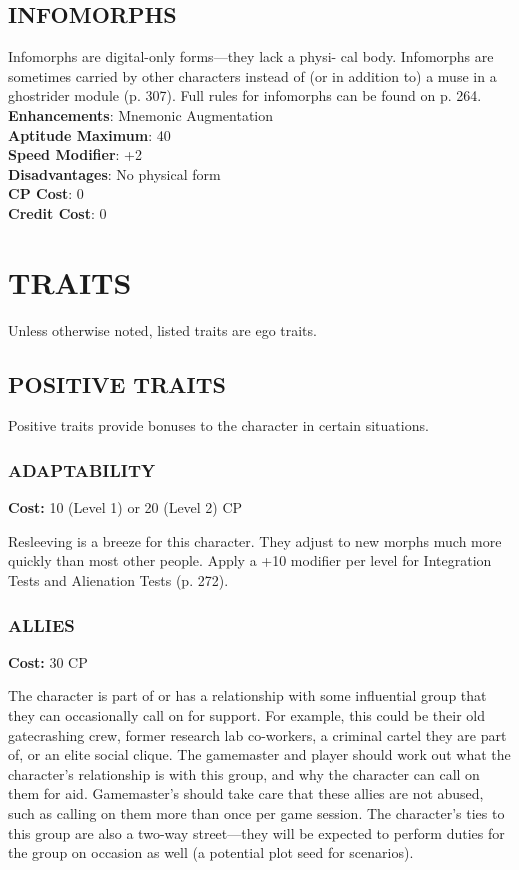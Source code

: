 \subsection{INFOMORPHS}
Infomorphs are digital-only forms—they lack a physi-
cal body. Infomorphs are sometimes carried by other
characters instead of (or in addition to) a muse in a
ghostrider module (p. 307). Full rules for infomorphs
can be found on p. 264.
\\ \textbf{Enhancements}: Mnemonic Augmentation
\\ \textbf{Aptitude Maximum}: 40
\\ \textbf{Speed Modifier}: +2
\\ \textbf{Disadvantages}: No physical form
\\ \textbf{CP Cost}: 0
\\ \textbf{Credit Cost}: 0


\section{TRAITS}
Unless otherwise noted, listed traits are ego traits.

\subsection{POSITIVE TRAITS}
Positive traits provide bonuses to the character in
certain situations.

\subsubsection{ADAPTABILITY}
\textbf{Cost:} 10 (Level 1) or 20 (Level 2) CP

Resleeving is a breeze for this character. They adjust
to new morphs much more quickly than most other
people. Apply a +10 modifier per level for Integration
Tests and Alienation Tests (p. 272).

\subsubsection{ALLIES}
\textbf{Cost:} 30 CP

The character is part of or has a relationship with
some influential group that they can occasionally call
on for support. For example, this could be their old
gatecrashing crew, former research lab co-workers,
a criminal cartel they are part of, or an elite social
clique. The gamemaster and player should work out
what the character’s relationship is with this group,
and why the character can call on them for aid.
Gamemaster’s should take care that these allies are
not abused, such as calling on them more than once
per game session. The character’s ties to this group
are also a two-way street—they will be expected to
perform duties for the group on occasion as well (a
potential plot seed for scenarios).

